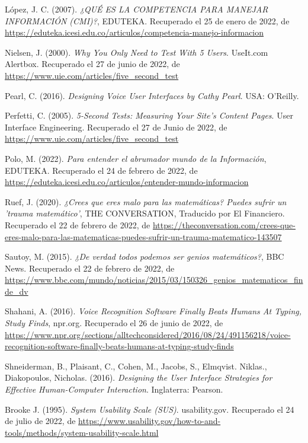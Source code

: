 \begin{thebibliography}{9}
López, J. C. (2007). \emph{¿QUÉ ES LA COMPETENCIA PARA MANEJAR INFORMACIÓN (CMI)?}, EDUTEKA. Recuperado el 25 de enero de 2022, de \url{https://eduteka.icesi.edu.co/articulos/competencia-manejo-informacion}

Nielsen, J. (2000). \emph{Why You Only Need to Test With 5 Users}. UseIt.com Alertbox. Recuperado el 27 de junio de 2022, de \url{https://www.uie.com/articles/five_second_test}

Pearl, C. (2016). \emph{Designing Voice User Interfaces by Cathy Pearl}. USA: O'Reilly.

Perfetti, C. (2005). \emph{5-Second Tests: Measuring Your Site's Content Pages}. User Interface Engineering. Recuperado el 27 de Junio de 2022, de \url{https://www.uie.com/articles/five_second_test}

Polo, M. (2022). \emph{Para entender el abrumador mundo de la Información}, EDUTEKA. Recuperado el 24 de febrero de 2022, de \url{https://eduteka.icesi.edu.co/articulos/entender-mundo-informacion}

Ruef, J. (2020). \emph{¿Crees que eres malo para las matemáticas? Puedes sufrir un 'trauma matemático'}, THE CONVERSATION, Traducido por El Financiero. Recuperado el 22 de febrero de 2022, de \url{https://theconversation.com/crees-que-eres-malo-para-las-matematicas-puedes-sufrir-un-trauma-matematico-143507}

Sautoy, M. (2015). \emph{¿De verdad todos podemos ser genios matemáticos?}, BBC News. Recuperado el 22 de febrero de 2022, de \url{https://www.bbc.com/mundo/noticias/2015/03/150326_genios_matematicos_finde_dv}

Shahani, A. (2016). \emph{Voice Recognition Software Finally Beats Humans At Typing, Study Finds}, npr.org. Recuperado el 26 de junio de 2022, de \url{https://www.npr.org/sections/alltechconsidered/2016/08/24/491156218/voice-recognition-software-finally-beats-humans-at-typing-study-finds}

Shneiderman, B., Plaisant, C., Cohen, M., Jacobs, S., Elmqvist. Niklas., Diakopoulos, Nicholas. (2016). \emph{Designing the User Interface Strategies for Effective Human-Computer Interaction}. Inglaterra: Pearson.

Brooke J. (1995). \emph{System Usability Scale (SUS)}. usability.gov. Recuperado el 24 de julio de 2022, de \url{https://www.usability.gov/how-to-and-tools/methods/system-usability-scale.html}

\end{thebibliography}